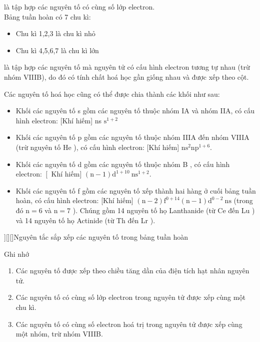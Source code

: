 \begin{ghinho}
	 là tập hợp các nguyên tố có cùng số lớp electron.\\
	Bảng tuần hoàn có 7 chu kì:
	\begin{itemize}
		\item Chu kì 1,2,3 là chu kì nhỏ
		\item Chu kì 4,5,6,7 là chu kì lớn
	\end{itemize}
	\begin{center}
	\end{center}
\end{ghinho}
\begin{ghinho}
	 là tập hợp các nguyên tố mà nguyên tử có cấu hình electron tương tự nhau (trừ nhóm VIIIB), do đó có tính chất hoá học gần giống nhau và được xếp theo cột.
	\begin{center}
	\end{center}
\end{ghinho}
\begin{tomtat}
	Các nguyên tố hoá học cũng có thể được chia thành các khối như sau:
	\begin{itemize}
		\item  Khối các nguyên tố s gồm các nguyên tố thuộc nhóm IA và nhóm IIA, có cấu hình electron: [Khí hiếm] ns $\mathrm{s}^{1+2}$
		\item  Khối các nguyên tố p gồm các nguyên tố thuộc nhóm IIIA đến nhóm VIIIA (trừ nguyên tố He ), có cấu hình electron: [Khí hiếm] $\mathrm{ns}^2 \mathrm{np}^{1+6}$.
		\item  Khối các nguyên tố d gồm các nguyên tố thuộc nhóm B , có cấu hình electron: $\left[\right.$ Khí hiếm] $(\mathrm{n}-1) \mathrm{d}^{1+10} \mathrm{~ns}^{1+2}$.
		\item  Khối các nguyên tố f gồm các nguyên tố xếp thành hai hàng ở cuối bảng tuần hoàn, có cấu hình electron: [Khí hiếm] $(\mathrm{n}-2) \mathrm{f}^{0+14}(\mathrm{n}-1) \mathrm{d}^{0-2} \mathrm{~ns}$ (trong đó $\mathrm{n}=6$ và $\mathrm{n}=7$ ). Chúng gồm 14 nguyên tố họ Lanthanide (từ Ce đến Lu ) và 14 nguyên tố họ Actinide (từ Th đến Lr ).
	\end{itemize}
\end{tomtat}
\Noibat[\maunhan][\myfont[16]{qag}][\faArrowCircleORight][]{Nguyên tắc sắp xếp các nguyên tố trong bảng tuần hoàn}
\begin{tongket}{Ghi nhớ}
	\begin{enumerate}
		\item Các nguyên tố được xếp theo chiều tăng dần của điện tích hạt nhân nguyên tử.
		\item Các nguyên tố có cùng số lớp electron trong nguyên tử được xếp cùng một chu kì.
		\item Các nguyên tố có cùng số electron hoá trị trong nguyên tử được xếp cùng một nhóm, trừ nhóm VIIIB.
	\end{enumerate}
\end{tongket}